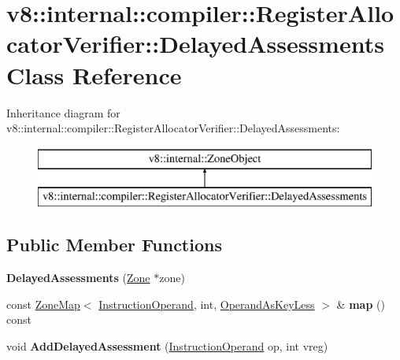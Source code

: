 \hypertarget{classv8_1_1internal_1_1compiler_1_1_register_allocator_verifier_1_1_delayed_assessments}{}\section{v8\+:\+:internal\+:\+:compiler\+:\+:Register\+Allocator\+Verifier\+:\+:Delayed\+Assessments Class Reference}
\label{classv8_1_1internal_1_1compiler_1_1_register_allocator_verifier_1_1_delayed_assessments}
Inheritance diagram for v8\+:\+:internal\+:\+:compiler\+:\+:Register\+Allocator\+Verifier\+:\+:Delayed\+Assessments\+:\begin{figure}[H]
\begin{center}
\leavevmode
\includegraphics[height=2.000000cm]{classv8_1_1internal_1_1compiler_1_1_register_allocator_verifier_1_1_delayed_assessments}
\end{center}
\end{figure}
\subsection*{Public Member Functions}
\begin{DoxyCompactItemize}
\item 
{\bfseries Delayed\+Assessments} (\hyperlink{classv8_1_1internal_1_1_zone}{Zone} $\ast$zone)\hypertarget{classv8_1_1internal_1_1compiler_1_1_register_allocator_verifier_1_1_delayed_assessments_a68ffaf32a4cddde820c891c7f6d94fcf}{}\label{classv8_1_1internal_1_1compiler_1_1_register_allocator_verifier_1_1_delayed_assessments_a68ffaf32a4cddde820c891c7f6d94fcf}

\item 
const \hyperlink{classv8_1_1internal_1_1_zone_map}{Zone\+Map}$<$ \hyperlink{classv8_1_1internal_1_1compiler_1_1_instruction_operand}{Instruction\+Operand}, int, \hyperlink{structv8_1_1internal_1_1compiler_1_1_operand_as_key_less}{Operand\+As\+Key\+Less} $>$ \& {\bfseries map} () const \hypertarget{classv8_1_1internal_1_1compiler_1_1_register_allocator_verifier_1_1_delayed_assessments_a75a8586b7029f7bfc572a1dff778e186}{}\label{classv8_1_1internal_1_1compiler_1_1_register_allocator_verifier_1_1_delayed_assessments_a75a8586b7029f7bfc572a1dff778e186}

\item 
void {\bfseries Add\+Delayed\+Assessment} (\hyperlink{classv8_1_1internal_1_1compiler_1_1_instruction_operand}{Instruction\+Operand} op, int vreg)\hypertarget{classv8_1_1internal_1_1compiler_1_1_register_allocator_verifier_1_1_delayed_assessments_a3bcaeca0276eec655f0f7c55462175cb}{}\label{classv8_1_1internal_1_1compiler_1_1_register_allocator_verifier_1_1_delayed_assessments_a3bcaeca0276eec655f0f7c55462175cb}

\end{DoxyCompactItemize}
